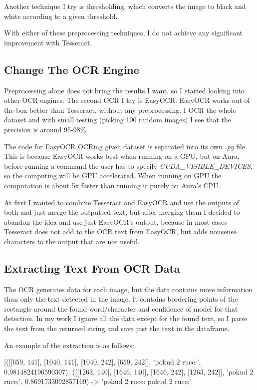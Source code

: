 \documentclass[
  digital,     %
  oneside,     %
  nosansbold,  %
  nocolorbold, %
  nolof,         %
  nolot,         %
]{fithesis4}
\begin{document}
Another technique I try is thresholding, which converts the image to black and white according to a given threshold.

With either of these preprocessing techniques, I do not achieve any significant improvement with Tesseract.

\subsection{Change The OCR Engine}

Preprocessing alone does not bring the results I want, so I started looking into other OCR engines. The second OCR I try is EasyOCR. EasyOCR works out of the box better than Tesseract, without any preprocessing. I OCR the whole dataset and with small testing (picking 100 random images) I see that the precision is around 95-98\%.

The code for EasyOCR OCRing given dataset is separated into its own \emph{.py} file. This is because EasyOCR works best when running on a GPU, but on Aura, before running a command the user has to specify \emph{CUDA\_VISIBLE\_DEVICES}, so the computing will be GPU accelerated. When running on GPU the computation is about 5x faster than running it purely on Aura's CPU.

At first I wanted to combine Tesseract and EasyOCR and use the outputs of both and just merge the outputted text, but after merging them I decided to abandon the idea and use just EasyOCR's output, because in most cases Tesseract does not add to the OCR text from EasyOCR, but adds nonsense characters to the output that are not useful.

\subsection{Extracting Text From OCR Data}

The OCR generates data for each image, but the data contains more information than only the text detected in the image. It contains bordering points of the rectangle around the found word/character and confidence of model for that detection. In my work I ignore all the data except for the found text, so I parse the text from the returned string and save just the text in the dataframe.

An example of the extraction is as follows:

[([[659, 141], [1040, 141], [1040, 242], [659, 242]], 'pokud 2 ruce:', 0.9814824196590307), ([[1263, 140], [1646, 140], [1646, 242], [1263, 242]], 'pokud 2 ruce:', 0.8691733092857169) -> 'pokud 2 ruce: pokud 2 ruce:'
\end{document}

